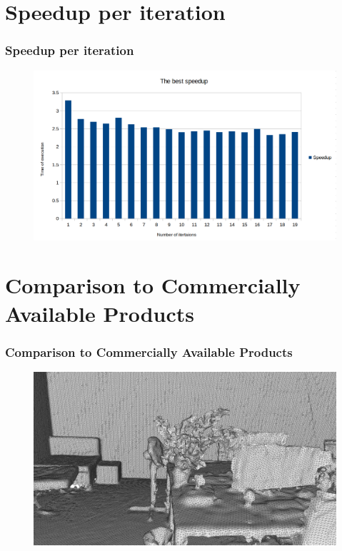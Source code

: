 \documentclass[
	10pt,
	t		%
]{beamer}
\begin{document}
\section{Speedup per iteration}
\begin{frame}
\frametitle{Speedup per iteration}
\begin{figure}[ht]
\centering
\includegraphics[width=1\textwidth]{chart2}
\end{figure}
\end{frame}

\section{Comparison to Commercially Available Products}
\begin{frame}
\frametitle{Comparison to Commercially Available Products}
\begin{figure}[ht]
\centering
\includegraphics[width=1\textwidth]{original}
\end{figure}
\end{frame}
\end{document}
